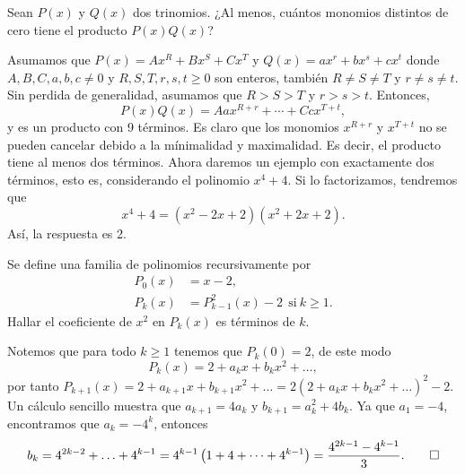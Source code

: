 \begin{example}
    Sean $P(x)$ y $Q(x)$ dos trinomios.
    ¿Al menos, cuántos monomios distintos de cero tiene el producto $P(x) Q(x)$?
\end{example}
\begin{solution}
    Asumamos que $P(x) = Ax^R + Bx^S + Cx^T$ y $Q(x) = ax^r + bx^s + cx^t$
    donde $A, B, C, a, b,c \neq 0$ y $R, S, T, r, s, t \geq 0$ son enteros, también $R \neq S \neq T$ y $r \neq s \neq t$.
    Sin perdida de generalidad, asumamos que $R > S > T$ y $r > s > t$.
    Entonces,
    \[
        P(x) Q(x) = Aax^{R + r} + \cdots + Ccx^{T + t},
    \]
    y es un producto con 9 términos.
    Es claro que los monomios $x^{R + r}$ y $x^{T + t}$ no se pueden cancelar debido a la mínimalidad y maximalidad.
    Es decir, el producto tiene al menos dos términos.
    Ahora daremos un ejemplo con exactamente dos términos, esto es, considerando el polinomio $x^4 + 4$.
    Si lo factorizamos, tendremos que
    \[
        x^4 + 4 = (x^2 - 2x + 2)(x^2 + 2x + 2).
    \]
    Así, la respuesta es 2.
\end{solution}

\begin{example}
    Se define una familia de polinomios recursivamente por
    \begin{align*}
        P_0(x) &= x - 2,\\
        P_k(x) &= P_{k - 1}^2(x) - 2 \ \ \text{si} \ k \geq 1.
    \end{align*}
    Hallar el coeficiente de $x^2$ en $P_k(x)$ es términos de $k$.
\end{example}
\begin{solution}
    Notemos que para todo $k \geq 1$ tenemos que $P_k(0) = 2$, de este modo
    \[
        P_k(x) = 2 + a_k x + b_k x^2 + \ldots,
    \]
    por tanto $P_{k + 1}(x) = 2 + a_{k + 1}x + b_{k + 1} x^2 + \ldots = 2(2 + a_k x + b_k x^2 + \ldots)^2 - 2.$
    Un cálculo sencillo muestra que $a_{k + 1} = 4a_k$ y $b_{k + 1} = a_k^2 + 4b_k$.
    Ya que $a_1 = -4$, encontramos que $a_k = -4^k$, entonces
    \[
        b_k = 4^{2k - 2} + \ldots + 4^{k - 1} = 4^{k - 1}\left(1 + 4 + \cdots + 4^{k - 1}\right) = \frac{4^{2k - 1} - 4^{k - 1}}{3}. \qedhere
    \]
\end{solution}

